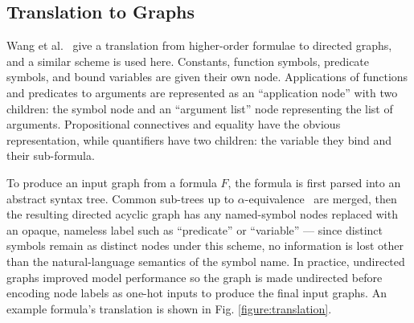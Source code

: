 \documentclass{llncs}
\begin{document}
\subsection{Translation to Graphs}
Wang et al.~\cite{formula-graph} give a translation from higher-order formulae to directed graphs, and a similar scheme is used here.
Constants, function symbols, predicate symbols, and bound variables are given their own node.
Applications of functions and predicates to arguments are represented as an ``application node'' with two children: the symbol node and an ``argument list'' node representing the list of arguments.
Propositional connectives and equality have the obvious representation, while quantifiers have two children: the variable they bind and their sub-formula.

To produce an input graph from a formula \(F\), the formula is first parsed into an abstract syntax tree.
Common sub-trees up to \(\alpha\)-equivalence~\cite{barendregt} are merged, then the resulting directed acyclic graph has any named-symbol nodes replaced with an opaque, nameless label such as ``predicate'' or ``variable'' --- since distinct symbols remain as distinct nodes under this scheme, no information is lost other than the natural-language semantics of the symbol name.
In practice, undirected graphs improved model performance so the graph is made undirected before encoding node labels as one-hot inputs to produce the final input graphs.
An example formula's translation is shown in Fig. \ref{figure:translation}.
\end{document}
